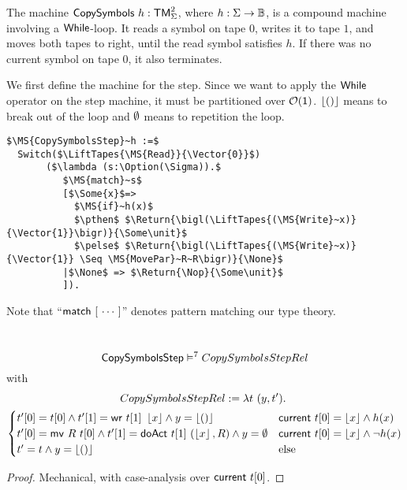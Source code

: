 The machine $\mathsf{CopySymbols}~h : \mathsf{TM}_\Sigma^2$, where $h:\Sigma\rightarrow\mathbb{B}$, is a compound machine involving a $\mathsf{While}$-loop.  It reads a symbol on tape
$0$, writes it to tape $1$, and moves both tapes to right, until the read symbol satisfies $h$.  If there was no current symbol on tape $0$, it also
terminates.

We first define the machine for the step.  Since we want to apply the $\mathsf{While}$ operator on the step machine, it must be partitioned over
$\mathcal{O}(\mathsf{1})$.  $\left\lfloor {\ensuremath{\mathsf{()}}} \right\rfloor$ means to break out of the loop and $\emptyset$ means to repetition the loop.
\begin{definition}
  \label{CopySymbols_Step}
\begin{lstlisting}[style=semicoqstyle]
$\MS{CopySymbolsStep}~h :=$
  Switch($\LiftTapes{\MS{Read}}{\Vector{0}}$)
       ($\lambda (s:\Option(\Sigma)).$
          $\MS{match}~s$
          [$\Some{x}$=>
            $\MS{if}~h(x)$
            $\pthen$ $\Return{\bigl(\LiftTapes{(\MS{Write}~x)}{\Vector{1}}\bigr)}{\Some\unit}$ 
            $\pelse$ $\Return{\bigl(\LiftTapes{(\MS{Write}~x)}{\Vector{1}} \Seq \MS{MovePar}~R~R\bigr)}{\None}$ 
          |$\None$ => $\Return{\Nop}{\Some\unit}$ 
          ]).
\end{lstlisting}
\end{definition}

Note that ``$\mathsf{match}~[~\cdots~]$'' denotes pattern matching our type theory.

\begin{lemma}
  \label{lem:CopySymbols_Step_Sem}
  ~
  \[
    \mathsf{CopySymbolsStep} \mathrel{\vDash^{7}} CopySymbolsStepRel
  \]
  with
  \small
  \begin{multline*}
    CopySymbolsStepRel := \lambda t~(y, t').~\\
    \begin{cases}
      t'[0] = t[0]           \land t'[1]=\mathsf{wr}~t[1]~\left\lfloor {x} \right\rfloor         \land y=\left\lfloor {\ensuremath{\mathsf{()}}} \right\rfloor & \mathsf{current}~t[0]=\left\lfloor {x} \right\rfloor \land       h(x) \\
      t'[0] = \mathsf{mv}~R~t[0] \land t'[1]=\mathsf{doAct}~t[1]~(\left\lfloor {x} \right\rfloor, R) \land y=\emptyset      & \mathsf{current}~t[0]=\left\lfloor {x} \right\rfloor \land \lnot h(x) \\
      t' = t \land y=\left\lfloor {\ensuremath{\mathsf{()}}} \right\rfloor                                                           & \text{else}
    \end{cases}
  \end{multline*}
\end{lemma}
\begin{proof}
  Mechanical, with case-analysis over $\mathsf{current}~t[0]$.
\end{proof}

